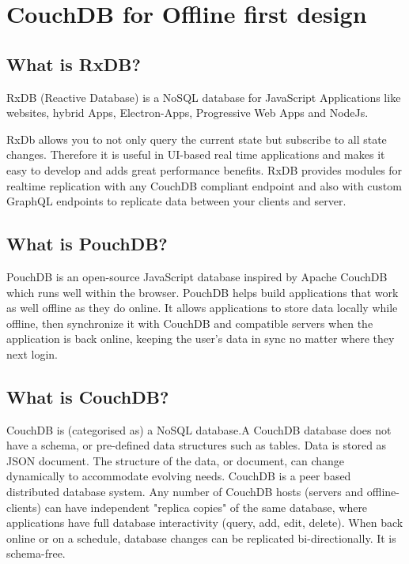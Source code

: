 \section{CouchDB for Offline first design}

\subsection{What is RxDB?}

RxDB (Reactive Database) is a NoSQL database for JavaScript Applications 
like websites, hybrid Apps, Electron-Apps, Progressive Web Apps and NodeJs.

RxDb allows you to not only query the current state but subscribe to all state changes.
Therefore it is useful in UI-based real time applications and makes it easy to develop 
and adds great performance benefits.
RxDB provides modules for realtime replication with any CouchDB compliant endpoint and 
also with custom GraphQL endpoints to replicate data between your clients and server.~\cite{RxDB}

\subsection{What is PouchDB?}

PouchDB is an open-source JavaScript database inspired by Apache CouchDB which 
runs well within the browser. PouchDB helps build applications that work as well 
offline as they do online. It allows applications to store data locally while offline, 
then synchronize it with CouchDB and compatible servers when the application is back 
online, keeping the user's data in sync no matter where they next login.~\cite{PouchGuide}

\subsection{What is CouchDB?}

CouchDB is (categorised as) a NoSQL database.A CouchDB database does not have a schema, 
or pre-defined data structures such as tables. Data is stored as JSON document. 
The structure of the data, or document, can change dynamically to accommodate evolving needs.  
CouchDB is a peer based distributed database system. Any number of CouchDB hosts 
(servers and offline-clients) can have independent "replica copies" of the same database, 
where applications have full database interactivity (query, add, edit, delete). 
When back online or on a schedule, database changes can be replicated bi-directionally.
It is schema-free.~\cite{CouchConfluence}

